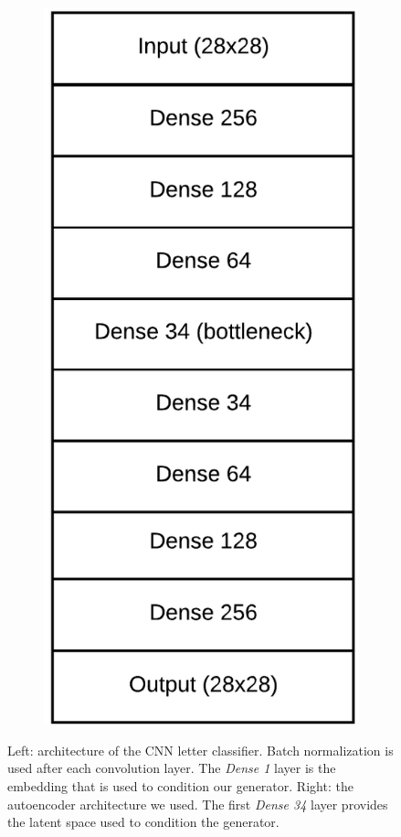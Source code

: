 \begin{figure}[!htbp]
\begin{subfigure}{0.4\textwidth}
    \end{subfigure}
    ~
    \begin{subfigure}{0.4\textwidth}
        \includegraphics[scale=1.0]{images/gbem/autoenc.png}
    \end{subfigure}
    \caption{Left: architecture of the CNN letter classifier. Batch normalization is used after each convolution layer. The \textit{Dense 1} layer is the embedding that is used to condition our generator. Right: the autoencoder architecture we used. The first \textit{Dense 34} layer provides the latent space used to condition the generator.}
    \label{fig:architectures}
\end{figure}

